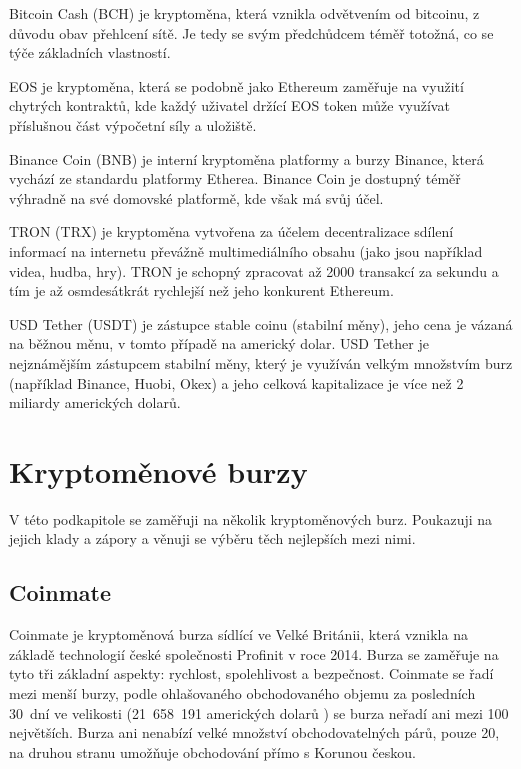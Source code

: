 \documentclass[thesis=B,czech]{FITthesis}[2019/03/21]
\begin{document}
Bitcoin Cash (BCH) je kryptoměna, která vznikla odvětvením od bitcoinu, z důvodu obav přehlcení sítě. Je tedy se svým předchůdcem téměř totožná, co se týče základních vlastností. \cite{kurzy_bch}

EOS je kryptoměna, která se podobně jako Ethereum zaměřuje na využití chytrých kontraktů, kde každý uživatel držící EOS token může využívat příslušnou část výpočetní síly a uložiště. \cite{finex_eos}

Binance Coin (BNB) je interní kryptoměna platformy a burzy Binance, která vychází ze standardu platformy Etherea. Binance Coin je dostupný téměř výhradně na své domovské platformě, kde však má svůj účel. \cite{martin_sistek_bnb}

TRON (TRX) je kryptoměna vytvořena za účelem decentralizace sdílení informací na internetu převážně multimediálního obsahu (jako jsou například videa, hudba, hry). TRON je schopný zpracovat až 2000 transakcí za sekundu a tím je až osmdesátkrát rychlejší než jeho konkurent Ethereum. \cite{finex_trx}

USD Tether (USDT) je zástupce stable coinu (stabilní měny), jeho cena je vázaná na běžnou měnu, v tomto případě na americký dolar. USD Tether je nejznámějším zástupcem stabilní měny, který je využíván velkým množstvím burz (například Binance, Huobi, Okex) a jeho celková kapitalizace je více než 2 miliardy amerických dolarů. \cite{mlady_investor_stable_coin} 

\section{Kryptoměnové burzy}
\label{cryptocurrency_exchanges}
V této podkapitole se zaměřuji na několik kryptoměnových burz. Poukazuji na jejich klady a zápory a věnuji se výběru těch nejlepších mezi nimi.

\subsection{Coinmate}
Coinmate je kryptoměnová burza sídlící ve Velké Británii, která vznikla na základě technologií české společnosti Profinit v roce 2014. Burza se zaměřuje na tyto tři základní aspekty: rychlost, spolehlivost a bezpečnost. Coinmate se řadí mezi menší burzy, podle ohlašovaného obchodovaného objemu za posledních 30~dní ve velikosti (21~658~191 amerických dolarů \cite{coin360}) se burza neřadí ani mezi 100 největších. \cite{coinmarketcap} Burza ani nenabízí velké množství obchodovatelných párů, pouze 20, na druhou stranu umožňuje obchodování přímo s Korunou českou. 
\end{document}
